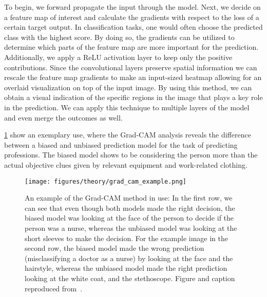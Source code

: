 To begin, we forward propagate the input through the model. Next, we decide on a
feature map of interest and calculate the gradients with respect to the loss of
a certain target output. In classification tasks, one would often choose the
predicted class with the highest score. By doing so, the gradients can be
utilized to determine which parts of the feature map are more important for the
prediction. Additionally, we apply a ReLU activation layer to keep only the
positive contributions. Since the convolutional layers preserve spatial
information we can rescale the feature map gradients to make an input-sized
heatmap allowing for an overlaid visualization on top of the input image. By using this method, we can obtain a visual indication of the specific regions in the image that plays a key role in the prediction. We can apply this technique to multiple layers of the model and even merge the outcomes as well.

\cref{fig:grad_cam_example} show an exemplary use, where the Grad-CAM analysis reveals the difference between a biased and unbiased prediction model for the task of predicting professions. The biased model shows to be considering the person more than the actual objective clues given by relevant equipment and work-related clothing.


\begin{figure}[!htb]
  \centering
  \texttt{[image: figures/theory/grad\_cam\_example.png]}
  \caption{An example of the Grad-CAM method in use: In the first row, we can see that even though both models made the right decision, the biased model was looking at the face of the person to decide if the person was a nurse, whereas the unbiased model was looking at the short sleeves to make the decision. For the example image in the second row, the biased model made the wrong prediction (misclassifying a doctor as a nurse) by looking at the face and the hairstyle, whereas the unbiased model made the right prediction looking at the white coat, and the stethoscope. Figure and caption reproduced from~\cite{Selvaraju_2019}. }
  \label{fig:grad_cam_example}
\end{figure}



